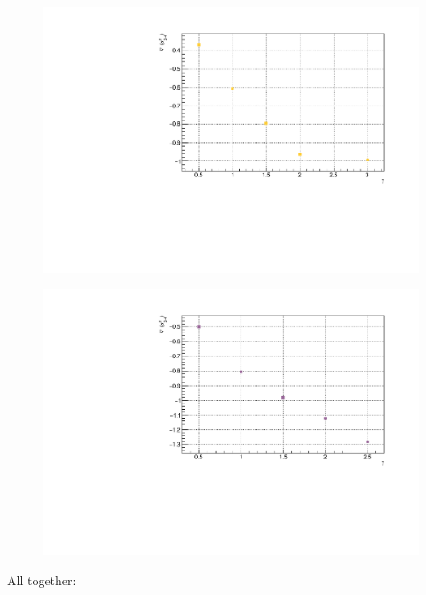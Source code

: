 \begin{figure}[H]
    \centering
    \includegraphics[scale=0.7]{Figures/12sites/12sites_gradLM_3and4VSgamma.pdf}
    \caption{}
    \label{fig:my_label}
\end{figure}

\begin{figure}[H]
    \centering
    \includegraphics[scale=0.7]{Figures/16sites/16sites_gradLM_3and4VSgamma.pdf}
    \caption{}
    \label{fig:my_label}
\end{figure}

All together:

